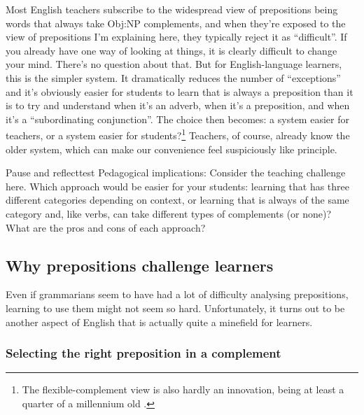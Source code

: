 Most English teachers subscribe to the widespread view of prepositions being words that always take Obj:NP complements, and when they're exposed to the view of prepositions I'm explaining here, they typically reject it as ``difficult''. If you already have one way of looking at things, it is clearly difficult to change your mind. There's no question about that. But for English-language learners, this is the simpler system. It dramatically reduces the number of ``exceptions'' and it's obviously easier for students to learn that  is always a preposition than it is to try and understand when it's an adverb, when it's a preposition, and when it's a ``subordinating conjunction''. The choice then becomes: a system easier for teachers, or a system easier for students?\footnote{The flexible-complement view is also hardly an innovation, being at least a quarter of a millennium old \citep{Hunter1784}.} Teachers, of course, already know the older system, which can make our convenience feel suspiciously like principle.

\begin{tblsframedsymbol}{Pause and reflect}{test}
Pedagogical implications: Consider the teaching challenge here. Which approach would be easier for your students: learning that  has three different categories depending on context, or learning that  is always of the same category and, like verbs, can take different types of complements (or none)? What are the pros and cons of each approach?
\end{tblsframedsymbol}

\subsection{Why prepositions challenge learners}

Even if grammarians seem to have had a lot of difficulty analysing prepositions,
learning to use them might not seem so hard. Unfortunately, it turns out to be
another aspect of English that is actually quite a minefield for learners.

\subsubsection*{Selecting the right preposition in a complement}

